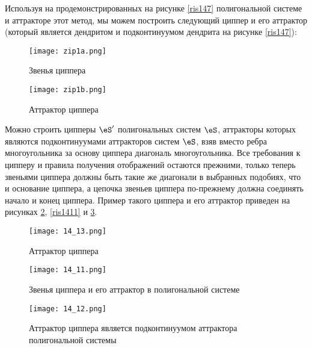 Используя на продемонстрированных на рисунке \ref{ris147} полигональной системе и аттракторе этот метод, мы можем построить следующий циппер и его аттрактор (который является дендритом и подконтинуумом дендрита на рисунке \ref{ris147}):

\begin{figure}[h!]
\begin{center}
\begin{minipage}[h]{0.48\linewidth}
\texttt{[image: zip1a.png]}
\caption{Звенья циппера} %
\label{zip1a} %
\end{minipage}
\hfill
\begin{minipage}[h]{0.48\linewidth}
\texttt{[image: zip1b.png]}
\caption{Аттрактор циппера}%
\label{zip1b}%
\end{minipage}
\end{center}
\end{figure}

Можно строить ципперы $\eS'$ полигональных систем $\eS$, аттракторы которых являются подконтинуумами аттракторов систем $\eS$, взяв вместо ребра многоугольника за основу циппера диагональ многоугольника. Все требования к ципперу и правила получения отображений остаются прежними, только теперь звеньями циппера должны быть такие же диагонали в выбранных подобиях, что и основание циппера, а цепочка звеньев циппера по-прежнему должна соединять начало и конец циппера. Пример такого циппера и его аттрактор приведен на рисунках \ref{ris1413}, \ref{ris1411} и \ref{ris1412}.

\begin{figure}[h]
\centering
\texttt{[image: 14\_13.png]}
\caption{Аттрактор циппера}%
\label{ris1413}%
\end{figure}

\begin{figure}[h!]
\begin{center}
\begin{minipage}[h]{0.49\linewidth}
\texttt{[image: 14\_11.png]}
\caption{Звенья циппера и его аттрактор в полигональной системе} %
\label{ris1411} %
\end{minipage}
\hfill
\begin{minipage}[h]{0.49\linewidth}
\texttt{[image: 14\_12.png]}
\caption{Аттрактор циппера является подконтинуумом аттрактора полигональной системы}%
\label{ris1412}%
\end{minipage}
\end{center}
\end{figure}

